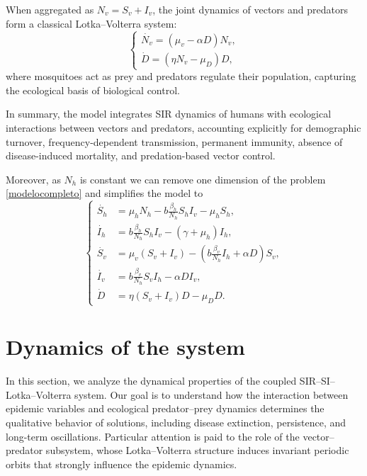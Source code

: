 \documentclass{amsart}
\theoremstyle{definition}
\theoremstyle{remark}
\numberwithin{equation}{section}
\begin{document}
When aggregated as $N_v = S_v + I_v$, the joint dynamics of vectors and predators form a classical Lotka--Volterra system:
\begin{equation}\label{eq: LV}
\begin{cases}
	\dot{N_v} = (\mu_v - \alpha D) N_v,\\[2mm]
	\dot{D} = (\eta N_v - \mu_D) D,
\end{cases}
\end{equation}
where mosquitoes act as prey and predators regulate their population, capturing the ecological basis of biological control.

In summary, the model integrates SIR dynamics of humans with ecological interactions between vectors and predators, accounting explicitly for demographic turnover, frequency-dependent transmission, permanent immunity, absence of disease-induced mortality, and predation-based vector control.



 Moreover, as $N_h$ is constant we can remove one dimension of the problem \eqref{modelocompleto} and simplifies the model to
	\begin{equation}\label{eq: modelo simple}    	
		\begin{cases}
			\dot{S_h} & = \mu_h N_h-b \frac{\beta_{h}}{N_h} S_h I_v-\mu_hS_h,\\
			\dot{I_h} & = b \frac{\beta_{h}}{N_h} S_h I_v - (\gamma+\mu_h) I_h, \\
			\dot{S_v} & = \mu_v (S_v+I_v) -(b \frac{\beta_{v}}{N_h}  I_h  + \alpha  D)S_v, \\
			\dot{I_v} & = b \frac{\beta_{v}}{N_h} S_v I_h - \alpha DI_v, \\
			\dot{D} & =  {\eta} (S_v + I_v ) D -\mu_D D .
		\end{cases}
	\end{equation}
		

\section{Dynamics of the system} \label{section 3}
In this section, we analyze the dynamical properties of the coupled SIR–SI–Lotka–Volterra system. Our goal is to understand how the interaction between epidemic variables and ecological predator–prey dynamics determines the qualitative behavior of solutions, including disease extinction, persistence, and long-term oscillations. Particular attention is paid to the role of the vector–predator subsystem, whose Lotka–Volterra structure induces invariant periodic orbits that strongly influence the epidemic dynamics.
\end{document}
